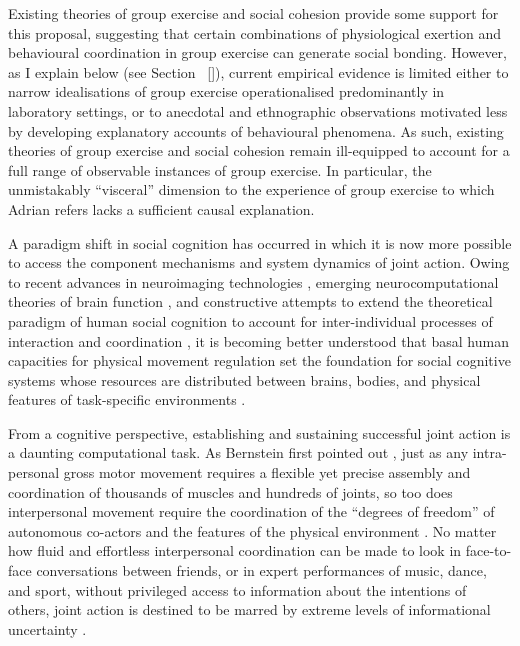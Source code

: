\begin{CJK}{UTF8}{gbsn}
Existing theories of group exercise and social cohesion provide some support for this proposal, suggesting that certain combinations of physiological exertion and behavioural coordination in group exercise can generate social bonding.  However, as I explain below (see Section ~\ref{}), current empirical evidence is limited either to narrow idealisations of group exercise operationalised predominantly in laboratory settings, or to anecdotal and ethnographic observations motivated less by developing explanatory accounts of behavioural phenomena.  As such, existing theories of group exercise and social cohesion remain ill-equipped to account for a full range of observable instances of group exercise.   In particular, the unmistakably ``visceral'' dimension to the experience of group exercise to which Adrian refers lacks a sufficient causal explanation.

A paradigm shift in social cognition has occurred in which it is now more possible to access the component mechanisms and system dynamics of joint action.  Owing to recent advances in neuroimaging technologies \citep{Frith2007}, emerging neurocomputational theories of brain function \citep{Yufik2013,Friston2010,Frith2010,Clark2013}, and constructive attempts to extend the theoretical paradigm of human social cognition to account for inter-individual processes of interaction and coordination \citep{Sebanz2006,Dale2014}, it is becoming better understood that basal human capacities for physical movement regulation set the foundation for social cognitive systems whose resources are distributed between brains, bodies, and physical features of task-specific environments \citep{Hutchins2000,Kirsh2006,Semin2008,Semin2012,Coey2012}.

From a cognitive perspective, establishing and sustaining successful joint action is a daunting computational task.  As Bernstein first pointed out \textcite{Bernstein1967}, just as any intra-personal gross motor movement requires a flexible yet precise assembly and coordination of thousands of muscles and hundreds of joints, so too does interpersonal movement require the coordination of the ``degrees of freedom'' of autonomous co-actors and the features of the physical environment \citep{Riley2011}.  No matter how fluid and effortless interpersonal coordination can be made to look in face-to-face conversations between friends, or in expert performances of music, dance, and sport, without privileged access to information about the intentions of others, joint action is destined to be marred by extreme levels of informational uncertainty \citep{Sebanz2009}.


\end{CJK}
